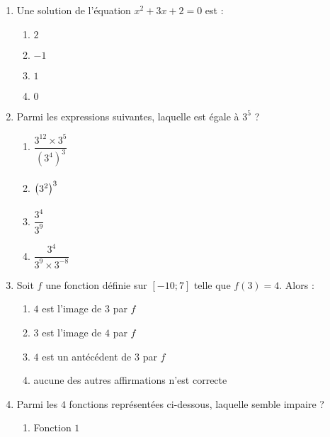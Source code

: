\documentclass[a4paper,dvipsnames]{article}
\begin{document}
\begin{enumerate}
  \item Une solution de l'équation $x^2+3x+2=0$ est :
    \vspace{-3mm}
    \begin{multicols}{4}
      \begin{enumerate}
	\item $2$
	\item $-1$
	\item $1$
	\item $0$
      \end{enumerate} 
    \end{multicols}
  \item Parmi les expressions suivantes, laquelle est égale à $3^5$ ?
    \vspace{-3mm}
    \begin{multicols}{4}
      \begin{enumerate}
	\item $\dfrac{3^{12}\times3^5}{\left(3^4\right)^3}$
	\item $\left(3^2\right)^3\vphantom{\dfrac{1^2}{2^2}}$
	\item $\dfrac{3^4}{3^9}$
	\item $\dfrac{3^4}{3^9\times3^{-8}}$
      \end{enumerate} 
    \end{multicols}
  \item Soit $f$ une fonction définie sur $[-10;7]$ telle que $f(3)=4$. Alors :
    \begin{multicols}{4}
      \begin{enumerate}
	\item $4$ est l'image de $3$ par $f$
	\item $3$ est l'image de $4$ par $f$
	\item $4$ est un antécédent de $3$ par $f$
	\item aucune des autres affirmations n'est correcte
      \end{enumerate}
    \end{multicols}
  \item Parmi les $4$ fonctions représentées ci-dessous, laquelle semble impaire ?
    \vspace{-3mm}
    \begin{multicols}{2}
      \begin{enumerate}
	\item Fonction $1$
	  \begin{center}

\end{center}
\end{enumerate}
\end{multicols}
\end{enumerate}
\end{document}
